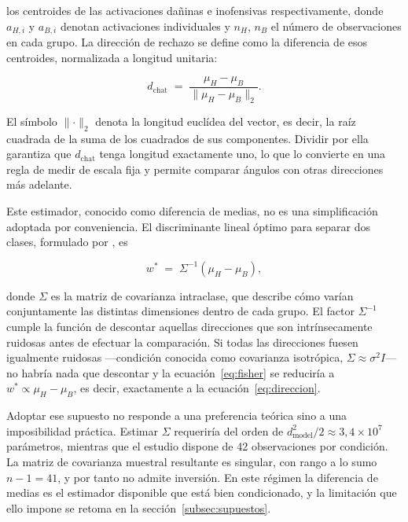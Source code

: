 \noindent
los centroides de las activaciones dañinas e inofensivas respectivamente,
donde $a_{H,i}$ y $a_{B,i}$ denotan activaciones individuales y $n_H$, $n_B$
el número de observaciones en cada grupo. La dirección de rechazo se define
como la diferencia de esos centroides, normalizada a longitud unitaria:

\begin{equation}
  d_{\text{chat}} \;=\; \frac{\mu_H - \mu_B}{\lVert \mu_H - \mu_B \rVert_2}.
  \label{eq:direccion}
\end{equation}

El símbolo $\lVert \cdot \rVert_2$ denota la longitud euclídea del vector, es
decir, la raíz cuadrada de la suma de los cuadrados de sus componentes. Dividir
por ella garantiza que $d_{\text{chat}}$ tenga longitud exactamente uno, lo que
lo convierte en una regla de medir de escala fija y permite comparar ángulos
con otras direcciones más adelante.

Este estimador, conocido como diferencia de medias, no es una simplificación
adoptada por conveniencia. El discriminante lineal óptimo para separar dos
clases, formulado por \textcite{fisher1936}, es

\begin{equation}
  w^{*} \;=\; \Sigma^{-1}\left(\mu_H - \mu_B\right),
  \label{eq:fisher}
\end{equation}

\noindent
donde $\Sigma$ es la matriz de covarianza intraclase, que describe cómo varían
conjuntamente las distintas dimensiones dentro de cada grupo. El factor
$\Sigma^{-1}$ cumple la función de descontar aquellas direcciones que son
intrínsecamente ruidosas antes de efectuar la comparación. Si todas las
direcciones fuesen igualmente ruidosas —condición conocida como covarianza
isotrópica, $\Sigma \approx \sigma^2 I$— no habría nada que descontar y la
ecuación~\eqref{eq:fisher} se reduciría a $w^{*} \propto \mu_H - \mu_B$, es
decir, exactamente a la ecuación~\eqref{eq:direccion}.

Adoptar ese supuesto no responde a una preferencia teórica sino a una
imposibilidad práctica. Estimar $\Sigma$ requeriría del orden de
$d_{\text{model}}^{2}/2 \approx 3{,}4 \times 10^{7}$ parámetros, mientras que
el estudio dispone de 42 observaciones por condición. La matriz de covarianza
muestral resultante es singular, con rango a lo sumo $n-1 = 41$, y por tanto no
admite inversión. En este régimen la diferencia de medias es el estimador
disponible que está bien condicionado, y la limitación que ello impone se
retoma en la sección~\ref{subsec:supuestos}.

